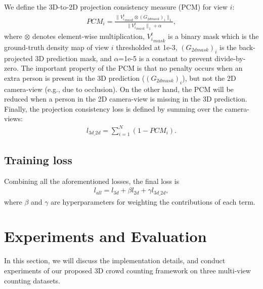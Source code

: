 \documentclass[letterpaper]{article}
\begin{document}
\par
We define the 3D-to-2D projection consistency measure (PCM) for view $i$:
\begin{align}
  PCM_{i} = \frac{\parallel {V_i^t}_{mask} \otimes (G_{2dmask})_{i} \parallel_1}{\parallel {V_i^t}_{mask} \parallel_1 + \alpha},
\end{align}
where $\otimes$ denotes element-wise multiplication, ${V_i^t}_{mask}$ is a binary mask which is the ground-truth density map of view $i$ thresholded at 1e-3, $(G_{2dmask})_{i}$ is the back-projected 3D prediction mask, and $\alpha$=1e-5 is a constant to prevent divide-by-zero.
The important property of the PCM is that no penalty occurs when an extra person is present in the 3D prediction ($(G_{2dmask})_{i}$), but not the 2D camera-view (e.g., due to occlusion). On the other hand, the PCM will be reduced when a person in the 2D camera-view is missing in the 3D prediction. Finally, the projection consistency loss is defined by summing over the camera-views:
\begin{align}
  l_{3d\_2d} = \sum_{i=1}^{N}(1 - PCM_{i}).
\end{align}

\subsection{Training loss}

Combining all the aforementioned losses, the final loss is
\begin{align}
  l_{all} = l_{3d} + \beta l_{2d} + \gamma l_{3d\_2d}, \label{loss_all}
\end{align}
where $\beta$ and $\gamma$ are hyperparameters for weighting the contributions of each term.



\section{Experiments and Evaluation}
In this section, we will discuss the implementation details, and conduct experiments of our proposed 3D crowd counting framework on three multi-view counting datasets.
\end{document}
